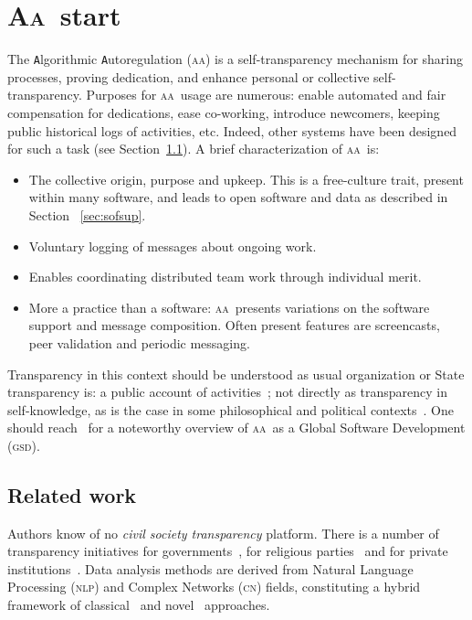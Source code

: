 \documentclass[a4paper, 11pt]{article} %
\newcommand{\nlp}{\textsc{nlp}}
\newcommand{\cn}{\textsc{cn}}
\newcommand{\aab}{\textsc{aa}}
\newcommand{\aai}{\textsc{Aa}}
\newcommand{\gsd}{\textsc{gsd}}
\begin{document}
\section{\aai\ start}\label{sec:start}
The {\tt A}lgorithmic {\tt A}utoregulation (\aab) is a self-transparency mechanism for sharing processes, proving dedication, and enhance personal or collective self-transparency. Purposes for \aab\ usage are numerous: enable automated and fair compensation for dedications, ease co-working, introduce newcomers, keeping public historical logs of activities, etc. Indeed, other systems have been designed for such a task (see Section~\ref{sec:rel}). A brief characterization of \aab\ is:
\begin{itemize}
    \item The collective origin, purpose and upkeep. This is a free-culture trait, present within many software, and leads to open software and data as described in Section ~\ref{sec:sofsup}.
    \item Voluntary logging of messages about ongoing work.
    \item Enables coordinating distributed team work through individual merit.
    \item More a practice than a software: \aab\ presents variations on the software support and message composition. Often present features are screencasts, peer validation and periodic messaging.
\end{itemize}

Transparency in this context should be understood as usual organization or State transparency is: a public account of activities~\cite{stso}; not directly as transparency in self-knowledge, as is the case in some philosophical and political contexts~\cite{stph}. One should reach~\cite{paaper} for a noteworthy overview of \aab\ as a Global Software Development (\gsd).

 \subsection{Related work}\label{sec:rel}
 Authors know of no \emph{civil society transparency} platform. There is a number of transparency initiatives for governments~\cite{govTr}, for religious parties~\cite{espTr} and for private institutions~\cite{priTr}. Data analysis methods are derived from Natural Language Processing (\nlp) and Complex Networks (\cn) fields, constituting a hybrid framework of classical~\cite{cla1,cla2} and novel~\cite{nov1,nov2} approaches.
\end{document}
